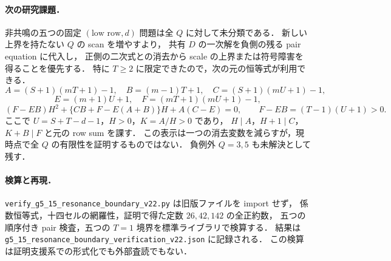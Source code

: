 \paragraph{次の研究課題．}
非共鳴の五つの固定 $(\text{low row},d)$ 問題は全 $Q$ に対して未分類である．
新しい上界を持たない $Q$ の scan を増やすより，
共有 $D$ の一次解を負側の残る pair equation に代入し，
正側の二次式との消去から scale の上界または符号障害を得ることを優先する．
特に $T\ge2$ に限定できたので，次の元の恒等式が利用できる．
\[
 A=(S+1)(mT+1)-1,\quad B=(m-1)T+1,\quad
 C=(S+1)(mU+1)-1,
\]
\[
 E=(m+1)U+1,\quad F=(mT+1)(mU+1)-1,
\]
\[
 (F-EB)H^2+\{CB+F-E(A+B)\}H+A(C-E)=0,
 \qquad F-EB=(T-1)(U+1)>0.
\]
ここで $U=S+T-d-1$，$H>0$，$K=A/H>0$ であり，
$H\mid A$，$H+1\mid C$，$K+B\mid F$ と元の row sum を課す．
この表示は一つの消去変数を減らすが，現時点で全 $Q$ の有限性を証明するものではない．
負例外 $Q=3,5$ も未解決として残す．

\paragraph{検算と再現．}
\nolinkurl{verify_g5_15_resonance_boundary_v22.py} は旧版ファイルを import せず，
係数恒等式，十四セルの網羅性，証明で得た定数 $26,42,142$ の全正約数，
五つの順序付き pair 検査，五つの $T=1$ 境界を標準ライブラリで検算する．
結果は \nolinkurl{g5_15_resonance_boundary_verification_v22.json} に記録される．
この検算は証明支援系での形式化でも外部査読でもない．
